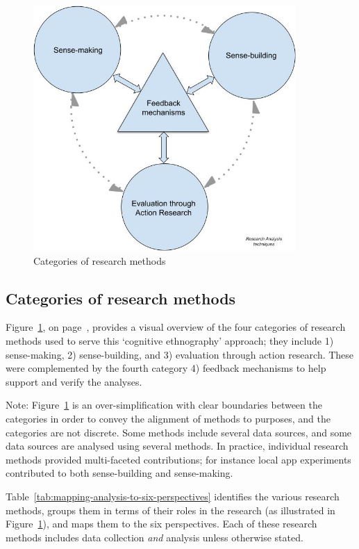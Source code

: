 \begin{figure}
    \centering
    \includegraphics[width=10cm]{images/my/analysis-techniques-in-PhD-08-Nov-2021.jpeg}
    \caption{Categories of research methods}
    \label{fig:categories-of-research-methods}
\end{figure}

\subsection{Categories of research methods}
Figure~\ref{fig:categories-of-research-methods}, on page~\pageref{fig:categories-of-research-methods}, provides a visual overview of the four categories of research methods used to serve this `cognitive ethnography' approach; they include 1) sense-making, 2) sense-building, and 3) evaluation through action research. These were complemented by the fourth category 4) feedback mechanisms to help support and verify the analyses. 

Note: Figure~\ref{fig:categories-of-research-methods} is an over-simplification with clear boundaries between the categories in order to convey the alignment of methods to purposes, and the categories are not discrete.  Some methods include several data sources, and some data sources are analysed using several methods. In practice, individual research methods provided multi-faceted contributions; for instance local app experiments contributed to both sense-building and sense-making. 


\medskip

Table~\ref{tab:mapping-analysis-to-six-perspectives} identifies the various research methods, groups them in terms of their roles in the research (as illustrated in Figure~\ref{fig:categories-of-research-methods}), and maps them to the six perspectives.  Each of these research methods includes data collection \textit{and} analysis unless otherwise stated.


